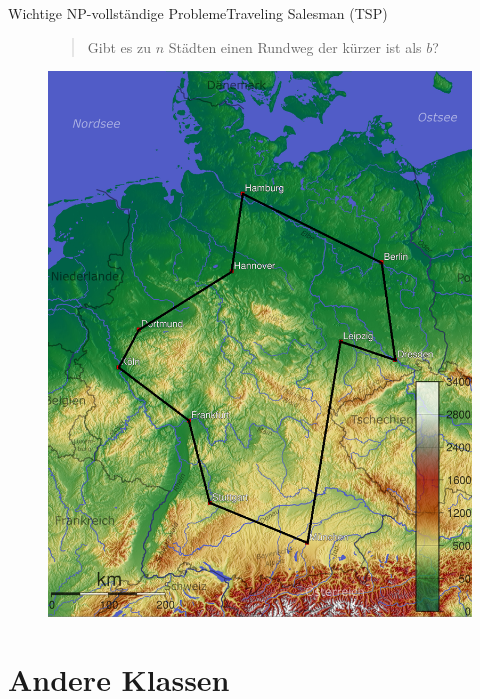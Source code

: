 \documentclass[ignorenonframetext,]{beamer}
\begin{document}
\begin{frame}{Wichtige NP-vollständige Probleme}{Traveling Salesman (TSP)}

\begin{figure}[htbp]
\begin{minipage}{0.58\textwidth}
\begin{quote}
Gibt es zu $n$ Städten einen Rundweg der kürzer ist als $b$?
\end{quote}
\end{minipage}
\begin{minipage}{0.4\textwidth}
\centering
\includegraphics{img/tsp.png}
\end{minipage}
\end{figure}
\end{frame}

\section{Andere Klassen}\label{andere-klassen}
\end{document}
